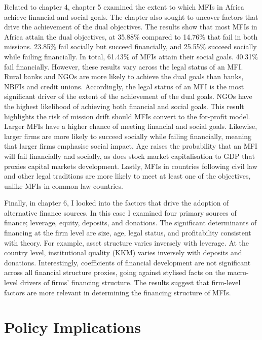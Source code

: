 \documentclass[a4paper, nobind]{templates/ociamthesis}
\begin{document}
Related to chapter 4, chapter 5 examined the extent to which MFIs in Africa achieve financial and social goals. The chapter also sought to uncover factors that drive the achievement of the dual objectives. The results show that most MFIs in Africa attain the dual objectives, at 35.88\% compared to 14.76\% that fail in both missions. 23.85\% fail socially but succeed financially, and 25.55\% succeed socially while failing financially. In total, 61.43\% of MFIs attain their social goals. 40.31\% fail financially. However, these results vary across the legal status of an MFI. Rural banks and NGOs are more likely to achieve the dual goals than banks, NBFIs and credit unions. Accordingly, the legal status of an MFI is the most significant driver of the extent of the achievement of the dual goals. NGOs have the highest likelihood of achieving both financial and social goals. This result highlights the risk of mission drift should MFIs convert to the for-profit model. Larger MFIs have a higher chance of meeting financial and social goals. Likewise, larger firms are more likely to succeed socially while failing financially, meaning that larger firms emphasise social impact. Age raises the probability that an MFI will fail financially and socially, as does stock market capitalisation to GDP that proxies capital markets development. Lastly, MFIs in countries following civil law and other legal traditions are more likely to meet at least one of the objectives, unlike MFIs in common law countries.

Finally, in chapter 6, I looked into the factors that drive the adoption of alternative finance sources. In this case I examined four primary sources of finance; leverage, equity, deposits, and donations. The significant determinants of financing at the firm level are size, age, legal status, and profitability consistent with theory. For example, asset structure varies inversely with leverage. At the country level, institutional quality (KKM) varies inversely with deposits and donations. Interestingly, coefficients of financial development are not significant across all financial structure proxies, going against stylised facts on the macro-level drivers of firms' financing structure. The results suggest that firm-level factors are more relevant in determining the financing structure of MFIs.

\hypertarget{policy-implications}{%
\section{Policy Implications}\label{policy-implications}}
\end{document}
